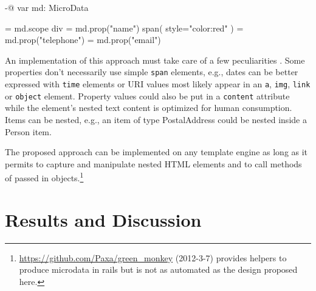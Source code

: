 \documentclass[11pt,a4paper,headsepline,twoside]{scrartcl}		%
\newcommand{\citeurl}[2]{\url{#1} (#2)}
\begin{document}
\begin{anylisting}[label=fig:microdata-template,
                   caption={Using a Microdata-aware data structure in a template}]
-@ var md: MicroData

= md.scope
  div
    = md.prop("name")
      span( style="color:red" )
    = md.prop("telephone")
    = md.prop("email")
\end{anylisting}

An implementation of this approach must take care of a few
peculiarities \cite{Hickson2011}. Some properties don't necessarily use simple
\lstinline:span: elements, e.g., dates can be better expressed with
\lstinline:time: elements or URI values most likely appear in an
\lstinline:a:, \lstinline:img:, \lstinline:link: or \lstinline:object:
element. Property values could also be put in a \lstinline:content: attribute
while the element's nested text content is optimized for human
consumption. Items can be nested, e.g., an item of type PostalAddress could be
nested inside a Person item.

The proposed approach can be implemented on any template engine as long as it
permits to capture and manipulate nested HTML elements and to call methods of
passed in
objects.\footnote{\citeurl{https://github.com/Paxa/green_monkey}{2012-3-7}
  provides helpers to produce microdata in rails but is not as automated as the
  design proposed here.}






\section{Results and Discussion}
\label{sec:results-discussion}
\end{document}
